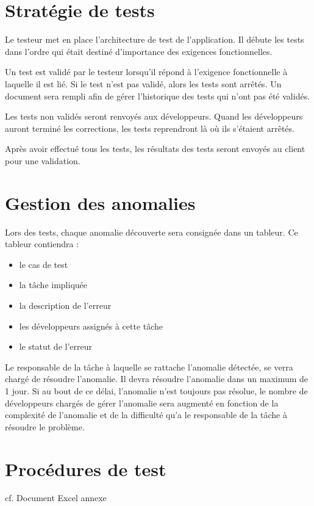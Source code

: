 \documentclass[a4paper,11pt,french]{article}
\begin{document}
\section{Stratégie de tests}
Le testeur met en place l’architecture de test de l’application. Il débute les tests dans l’ordre qui était destiné d’importance des exigences fonctionnelles. 

Un test est validé par le testeur lorsqu’il répond à l’exigence fonctionnelle à laquelle il est lié. Si le test n’est pas validé, alors les tests sont arrêtés. Un document sera rempli afin de gérer l’historique des tests qui n’ont pas été validés. 

Les tests non validés seront renvoyés aux développeurs. Quand les développeurs auront terminé les corrections, les tests reprendront là où ils s’étaient arrêtés.

Après avoir effectué tous les tests, les résultats des tests seront envoyés au client pour une validation.

\section{Gestion des anomalies}
Lors des tests, chaque anomalie découverte sera consignée dans un tableur. Ce tableur contiendra :
\begin{itemize}
\item le cas de test
\item la tâche impliquée
\item la description de l'erreur
\item les développeurs assignés à cette tâche
\item le statut de l'erreur
\end{itemize}

Le responsable de la tâche à laquelle se rattache l'anomalie détectée, se verra chargé de résoudre l'anomalie. 
Il devra résoudre l'anomalie dans un maximum de 1 jour. Si au bout de ce délai, l'anomalie n'est toujours 
pas résolue, le nombre de développeurs chargés de gérer l'anomalie sera augmenté en fonction de la complexité 
de l'anomalie et de la difficulté qu'a le responsable de la tâche à résoudre le problème.
\section{Procédures de test}
cf. Document Excel annexe
\end{document}
